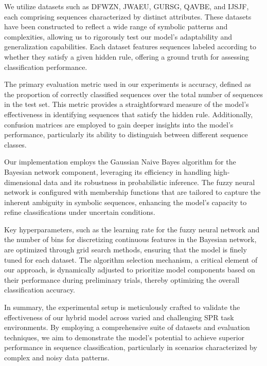 \documentclass{article}
\begin{document}
We utilize datasets such as DFWZN, JWAEU, GURSG, QAVBE, and IJSJF, each comprising sequences characterized by distinct attributes. These datasets have been constructed to reflect a wide range of symbolic patterns and complexities, allowing us to rigorously test our model's adaptability and generalization capabilities. Each dataset features sequences labeled according to whether they satisfy a given hidden rule, offering a ground truth for assessing classification performance.

The primary evaluation metric used in our experiments is accuracy, defined as the proportion of correctly classified sequences over the total number of sequences in the test set. This metric provides a straightforward measure of the model's effectiveness in identifying sequences that satisfy the hidden rule. Additionally, confusion matrices are employed to gain deeper insights into the model's performance, particularly its ability to distinguish between different sequence classes.

Our implementation employs the Gaussian Naive Bayes algorithm for the Bayesian network component, leveraging its efficiency in handling high-dimensional data and its robustness in probabilistic inference. The fuzzy neural network is configured with membership functions that are tailored to capture the inherent ambiguity in symbolic sequences, enhancing the model's capacity to refine classifications under uncertain conditions.

Key hyperparameters, such as the learning rate for the fuzzy neural network and the number of bins for discretizing continuous features in the Bayesian network, are optimized through grid search methods, ensuring that the model is finely tuned for each dataset. The algorithm selection mechanism, a critical element of our approach, is dynamically adjusted to prioritize model components based on their performance during preliminary trials, thereby optimizing the overall classification accuracy.

In summary, the experimental setup is meticulously crafted to validate the effectiveness of our hybrid model across varied and challenging SPR task environments. By employing a comprehensive suite of datasets and evaluation techniques, we aim to demonstrate the model's potential to achieve superior performance in sequence classification, particularly in scenarios characterized by complex and noisy data patterns.
\end{document}

